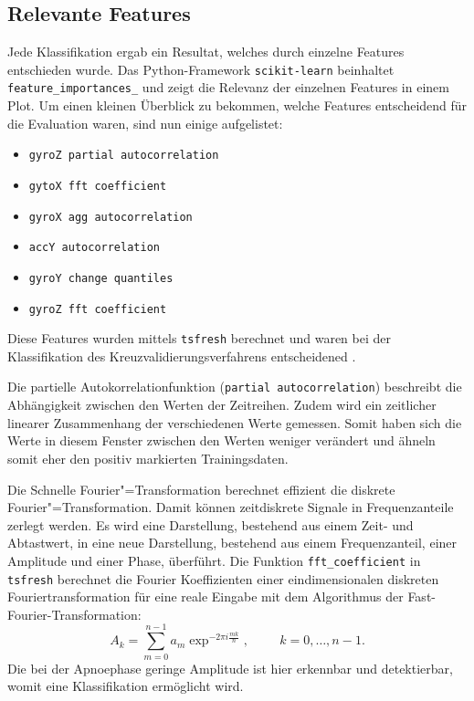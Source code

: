 \subsection{Relevante Features}
Jede Klassifikation ergab ein Resultat, welches durch einzelne Features entschieden wurde. 
Das Python-Framework \texttt{scikit-learn} beinhaltet \texttt{feature\_importances\_} und zeigt die Relevanz der einzelnen Features in einem Plot.
Um einen kleinen Überblick zu bekommen, welche Features entscheidend für die Evaluation waren, sind nun einige aufgelistet:
\begin{itemize}
    \item \texttt{gyroZ partial autocorrelation}
    \item \texttt{gytoX fft coefficient}
    \item \texttt{gyroX agg autocorrelation}
    \item \texttt{accY autocorrelation}
    \item \texttt{gyroY change quantiles }
    \item \texttt{gyroZ fft coefficient}
\end{itemize}
Diese Features wurden mittels \texttt{tsfresh} berechnet und waren bei der Klassifikation des Kreuzvalidierungsverfahrens entscheidened \cite{TsfreshTsfresh12}.

Die partielle Autokorrelationfunktion (\texttt{partial autocorrelation}) beschreibt die Abhängigkeit zwischen den Werten der Zeitreihen. 
Zudem wird ein zeitlicher linearer Zusammenhang der verschiedenen Werte gemessen.
Somit haben sich die Werte in diesem Fenster zwischen den Werten weniger verändert und ähneln somit eher den positiv markierten Trainingsdaten.

Die Schnelle Fourier"=Transformation berechnet effizient die diskrete Fourier"=Transformation.
Damit können zeitdiskrete Signale in Frequenzanteile zerlegt werden. 
Es wird eine Darstellung, bestehend aus einem Zeit- und Abtastwert, in eine neue Darstellung, bestehend aus einem Frequenzanteil, einer Amplitude und einer Phase, überführt.
Die Funktion \texttt{fft\_coefficient} in \texttt{tsfresh} berechnet die Fourier Koeffizienten einer eindimensionalen diskreten Fouriertransformation für eine reale Eingabe mit dem Algorithmus der Fast-Fourier-Transformation:
\[A_k = \sum_{m=0}^{n-1} a_m \exp ^ {-2\pi i \frac{mk}{n}}, \hspace{1cm} k = 0,\dots,n-1.\]
Die bei der Apnoephase geringe Amplitude ist hier erkennbar und detektierbar, womit eine Klassifikation ermöglicht wird.

